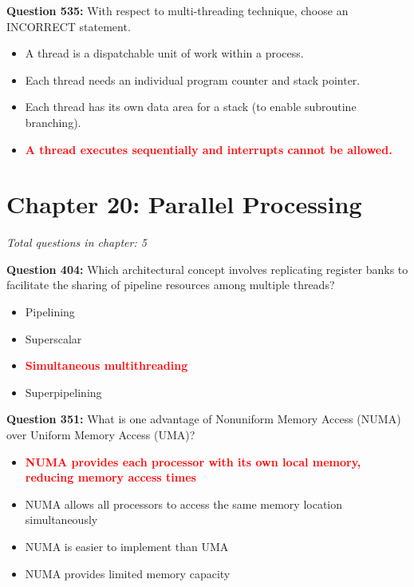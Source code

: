 \documentclass[12pt,a4paper]{article}
\begin{document}
\vspace{0.5cm}

\vspace{0.5cm}

\textbf{Question 535:} With respect to multi-threading technique, choose an INCORRECT statement.

\begin{itemize}
    \item[\textbf{A.}] A thread is a dispatchable unit of work within a process.
    \item[\textbf{B.}] Each thread needs an individual program counter and stack pointer.
    \item[\textbf{C.}] Each thread has its own data area for a stack (to enable subroutine branching).
    \item[\textbf{D.}] \textcolor{red}{\textbf{A thread executes sequentially and interrupts cannot be allowed.}}
\end{itemize}

\vspace{0.5cm}

\vspace{0.5cm}

\section{Chapter 20: Parallel Processing}
\textit{Total questions in chapter: 5}

\textbf{Question 404:} Which architectural concept involves replicating register banks to facilitate the sharing of pipeline resources among multiple threads?

\begin{itemize}
    \item[\textbf{A.}] Pipelining
    \item[\textbf{B.}] Superscalar
    \item[\textbf{C.}] \textcolor{red}{\textbf{Simultaneous multithreading}}
    \item[\textbf{D.}] Superpipelining
\end{itemize}

\vspace{0.5cm}

\vspace{0.5cm}

\textbf{Question 351:} What is one advantage of Nonuniform Memory Access (NUMA) over Uniform Memory Access (UMA)?

\begin{itemize}
    \item[\textbf{A.}] \textcolor{red}{\textbf{NUMA provides each processor with its own local memory, reducing memory access times}}
    \item[\textbf{B.}] NUMA allows all processors to access the same memory location simultaneously
    \item[\textbf{C.}] NUMA is easier to implement than UMA
    \item[\textbf{D.}] NUMA provides limited memory capacity
\end{itemize}
\end{document}
